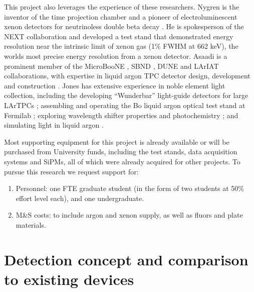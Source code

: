 This project also leverages the experience of these researchers.  Nygren is the inventor of the time projection chamber \cite{Nygren:1976fe} and a pioneer of electroluminescent xenon detectors for neutrinoless double beta decay \cite{Gonzalez-Diaz:2015oba,Mart,Nygren:2009zz,Goldschmidt:2011ria,Nygren:2007zzc,Sinclair:2011zz}.  He is spokesperson of the NEXT collaboration and developed a test stand that demonstrated energy resolution near the intrinsic limit of xenon gas \cite{Alvarez:2012yxw} (1\% FWHM at 662 keV), the worlds most precise energy resolution from a xenon detector. Asaadi is a prominent member of the MicroBooNE \cite{Chen:2007ae}, SBND \cite{Antonello:2015lea}, DUNE \cite{Acciarri:2015uup} and LArIAT \cite{Cavanna:2014iqa} collaborations, with expertise in liquid argon TPC detector design, development and construction \cite{Asaadi:2014iva}.  Jones has extensive experience in noble element light collection,  including the developing ``Wunderbar'' light-guide detectors for large LArTPCs \cite{Jones:2013sfa,Baptista:2012bf,Moss:2014ota}; assembling and operating the Bo liquid argon optical test stand at Fermilab \cite{Jones:2013bca,Jones:2013mfa,Jones:2013nea}; exploring wavelength shifter properties and photochemistry \cite{Jones:2012hm}; and simulating light in liquid argon \cite{uBOpticalSim,Jones:2013sfa}.

Most supporting equipment for this project is already available or will be purchased from University funds, including the test stands, data acquisition systems and SiPMs, all of which were already acquired for other projects.  To pursue this research we request support for: 

\begin{enumerate}
\item  Personnel: one FTE graduate student (in the form of two students at 50\% effort level each), and one undergraduate.
\item  M\&S costs: to include argon and xenon supply, as well as fluors and plate materials.
\end{enumerate}



\section{Detection concept and comparison to existing devices \label{sec:concept}}

